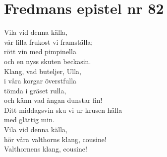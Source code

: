 \section{Fredmans epistel nr 82}

Vila vid denna källa,\\
vår lilla frukost vi framställa;\\
rött vin med pimpinella\\
och en nyss skuten beckasin.\\
Klang, vad buteljer, Ulla,\\
i våra korgar överstfulla\\
tömda i gräset rulla,\\
och känn vad ångan dunstar fin!\\

Ditt middagsvin sku vi ur krusen hälla\\
med glättig min.\\
Vila vid denna källa,\\
hör våra valthorns klang, cousine!\\
Valthornens klang, cousine!\\

